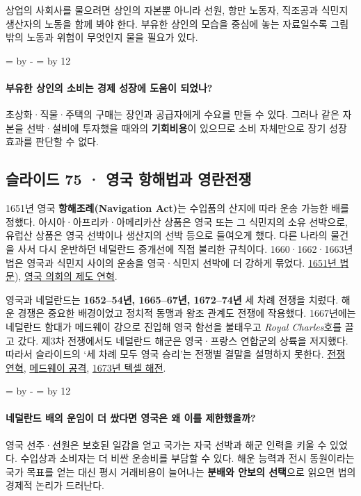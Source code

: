 \documentclass[10pt,a4paper]{article}
\newcommand{\ReserveQuestionSpace}{%
  \par\begingroup
  \dimen0=\pagegoal \advance\dimen0 by -\pagetotal
  \dimen2=\baselineskip \multiply\dimen2 by 12
  \ifdim\dimen0<\dimen2 \newpage\fi
  \endgroup}
\begin{document}
상업의 사회사를 물으려면 상인의 자본뿐 아니라 선원, 항만 노동자, 직조공과 식민지 생산자의 노동을 함께 봐야 한다. 부유한 상인의 모습을 중심에 놓는 자료일수록 그림 밖의 노동과 위험이 무엇인지 물을 필요가 있다.\par

\ReserveQuestionSpace
\paragraph{부유한 상인의 소비는 경제 성장에 도움이 되었나?}
초상화·직물·주택의 구매는 장인과 공급자에게 수요를 만들 수 있다. 그러나 같은 자본을 선박·설비에 투자했을 때와의 \textbf{기회비용}이 있으므로 소비 자체만으로 장기 성장 효과를 판단할 수 없다.\par

\subsection{슬라이드 75 · 영국 항해법과 영란전쟁}
1651년 영국 \textbf{항해조례(Navigation Act)}는 수입품의 산지에 따라 운송 가능한 배를 정했다. 아시아·아프리카·아메리카산 상품은 영국 또는 그 식민지의 소유 선박으로, 유럽산 상품은 영국 선박이나 생산지의 선박 등으로 들여오게 했다. 다른 나라의 물건을 사서 다시 운반하던 네덜란드 중개선에 직접 불리한 규칙이다. 1660·1662·1663년 법은 영국과 식민지 사이의 운송을 영국·식민지 선박에 더 강하게 묶었다. \href{https://en.wikisource.org/wiki/Navigation\_Act\_(1651}{1651년 법문}), \href{https://www.parliament.uk/about/living-heritage/transformingsociety/tradeindustry/importexport/overview/navigationlaws/}{영국 의회의 제도 연혁}.\par

영국과 네덜란드는 \textbf{1652–54년, 1665–67년, 1672–74년} 세 차례 전쟁을 치렀다. 해운 경쟁은 중요한 배경이었고 정치적 동맹과 왕조 관계도 전쟁에 작용했다. 1667년에는 네덜란드 함대가 메드웨이 강으로 진입해 영국 함선을 불태우고 \emph{Royal Charles}호를 끌고 갔다. 제3차 전쟁에서도 네덜란드 해군은 영국·프랑스 연합군의 상륙을 저지했다. 따라서 슬라이드의 ‘세 차례 모두 영국 승리’는 전쟁별 결말을 설명하지 못한다. \href{https://www.rmg.co.uk/collections/library/rmgl-2198}{전쟁 연혁}, \href{https://www.rmg.co.uk/collections/objects/rmgc-object-11787}{메드웨이 공격}, \href{https://www.rmg.co.uk/collections/objects/rmgc-object-11808}{1673년 텍셀 해전}.\par

\ReserveQuestionSpace
\paragraph{네덜란드 배의 운임이 더 쌌다면 영국은 왜 이를 제한했을까?}
영국 선주·선원은 보호된 일감을 얻고 국가는 자국 선박과 해군 인력을 키울 수 있었다. 수입상과 소비자는 더 비싼 운송비를 부담할 수 있다. 해운 능력과 전시 동원이라는 국가 목표를 얻는 대신 평시 거래비용이 늘어나는 \textbf{분배와 안보의 선택}으로 읽으면 법의 경제적 논리가 드러난다.\par
\end{document}
